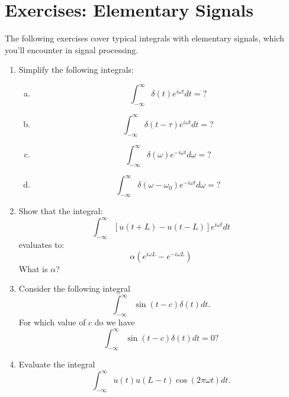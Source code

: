 \newpage
\section{Exercises: Elementary Signals}

The following exercises cover typical integrals with elementary signals, which you'll encounter in signal processing.

\begin{enumerate}
\item Simplify the following integrals:
  \begin{enumerate}[a)]
    \item
  \begin{equation*}
    \int_{-\infty}^{\infty} \delta(t)e^{i\omega t} dt = ?
  \end{equation*}
      \item

  \begin{equation*}
    \int_{-\infty}^{\infty} \delta(t-\tau)e^{i\omega t} dt = ?
    \end{equation*}
      \item
  \begin{equation*}
    \int_{-\infty}^{\infty} \delta(\omega)e^{-i\omega t} d\omega = ?
    \end{equation*}
      \item
  \begin{equation*}
    \int_{-\infty}^{\infty} \delta(\omega-\omega_0)e^{-i\omega t} d\omega = ?
  \end{equation*}
  \end{enumerate}
\item Show that the integral:
\begin{equation*}
    \int_{-\infty}^{\infty} [u(t+L)-u(t-L)]e^{i\omega t}dt
\end{equation*}
evaluates to:
\begin{equation*}
    \alpha (e^{i\omega L} - e^{-i\omega L})
\end{equation*}
What is $\alpha$?

\item Consider the following integral
\begin{equation*}
    \int_{-\infty}^{\infty}\sin(t-c)\delta(t)dt.
\end{equation*}
For which value of $c$ do we have
\begin{equation*}
    \int_{-\infty}^{\infty}\sin(t-c)\delta(t)dt=0?
\end{equation*}

\item Evaluate the integral
\begin{equation*}
    \int_{-\infty}^{\infty}u(t)u(L-t)\cos(2\pi\omega t)dt.
\end{equation*}



\end{enumerate}
